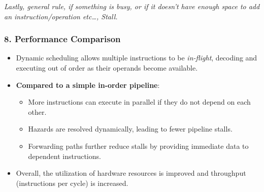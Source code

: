 {  \textit{Lastly, general rule, if something is busy, or if it doesn't have enough space to add an instruction/operation etc\dots, Stall.}\vspace*{-10px}
  \subsubsection*{8. Performance Comparison}
  \vspace{-5px}
  \begin{itemize}
      \item Dynamic scheduling allows multiple instructions to be \textit{in-flight}, decoding and executing out of order as their operands become available.
      \item \textbf{Compared to a simple in-order pipeline}:
      \begin{itemize}
          \item More instructions can execute in parallel if they do not depend on each other.
          \item Hazards are resolved dynamically, leading to fewer pipeline stalls.
          \item Forwarding paths further reduce stalls by providing immediate data to dependent instructions.
      \end{itemize}
      \item Overall, the utilization of hardware resources is improved and throughput (instructions per cycle) is increased.
  \end{itemize}
}